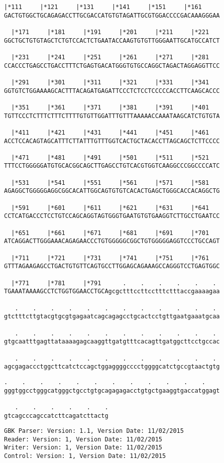 \documentclass{article}
\begin{document}
\begin{Verbatim}[fontfamily=courier]
  |*111     |*121     |*131     |*141     |*151     |*161   
GACTGTGGCTGCAGAGACCTTGCGACCATGTGTAGATTGCGTGGACCCCGACAAAGGGAA

  |*171     |*181     |*191     |*201     |*211     |*221   
GGCTGCTGTGTAGCTCTGTCCACTCTGAATACCAAGTGTGTTGGGAATTGCATGCCATCT

  |*231     |*241     |*251     |*261     |*271     |*281   
CCACCCTGAGCCTGACCTTTCTGAGTGACATGGGTGTGCCAGGCTAGACTAGGAGGTTCC

  |*291     |*301     |*311     |*321     |*331     |*341   
GGTGTCTGGAAAAGCACTTTACAGATGAGATTCCCTCTCCTCCCCCACCTTCAAGCACCC

  |*351     |*361     |*371     |*381     |*391     |*401   
TGTTCCCTCTTTCTTTCTTTTGTGTTGGATTTGTTTAAAAACCAAATAAGCATCTGTGTA

  |*411     |*421     |*431     |*441     |*451     |*461   
ACCTCCACAGTAGCATTTCTTATTTGTTTGGTCACTGCTACACCTTAGCAGCTCTTCCCC

  |*471     |*481     |*491     |*501     |*511     |*521   
TTTCCTGGGGGATGTGCACGGCAGCTTGAGCCTGTCACGTGGTCAAGGCCCGGCCCCATC

  |*531     |*541     |*551     |*561     |*571     |*581   
AGAGGCTGGGGGAGGCGGCACATTGGCAGTGTGTCACACTGAGCTGGGCACCACAGGCTG

  |*591     |*601     |*611     |*621     |*631     |*641   
CCTCATGACCCTCCTGTCCAGCAGGTAGTGGGTGAATGTGTGAAGGTCTTGCCTGAATCC

  |*651     |*661     |*671     |*681     |*691     |*701   
ATCAGGACTTGGGAAACAGAGAACCCTGTGGGGGCGGCTGTGGGGGAGGTCCCTGCCAGT

  |*711     |*721     |*731     |*741     |*751     |*761   
GTTTAGAAGAGCCTGACTGTGTTCAGTGCCTTGGAGCAGAAAGCCAGGGTCCTGAGTGGC

  |*771     |*781     |*791      .    .    .    .    .    . 
TGAAATAAAAGCCTCTGGTGGAACCTGCAgcgctttccttcctttctttaccgaaaagaa

   .    .    .    .    .    .    .    .    .    .    .    . 
gtctttcttgtacgtgcgtgagaatcagcagagcctgcactcctgttgaatgaaatgcaa

   .    .    .    .    .    .    .    .    .    .    .    . 
gtgcaatttgagttataaaagagcaaggttgatgtttcacagttgatggcttcctgccac

   .    .    .    .    .    .    .    .    .    .    .    . 
agcgagaccctggcttcatctccagctggaggggcccctggggcatctgccgtaactgtg

\end{Verbatim}
\newpage
\begin{Verbatim}[fontfamily=courier]
   .    .    .    .    .    .    .    .    .    .    .    . 
gggtggcctgggcatgggctgcctgtgcagagagacctgtgctgaaggtgaccatggagt

   .    .    .    .    .    .
gtcagcccagccatcttcagatcttactg
\end{Verbatim}
\newpage
\begin{Verbatim}[fontfamily=courier]
GBK Parser: Version: 1.1, Version Date: 11/02/2015
Reader: Version: 1, Version Date: 11/02/2015
Writer: Version: 1, Version Date: 11/02/2015
Control: Version: 1, Version Date: 11/02/2015
\end{Verbatim}
\end{document}
